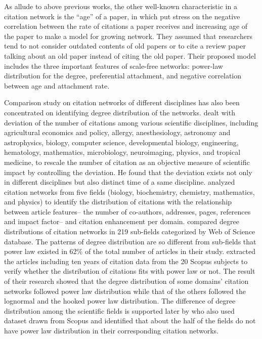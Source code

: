 \documentclass{article}
\begin{document}
As allude to above previous works, the other well-known characteristic in a citation network is the “age” of a paper, in which \cite{klemm2002highly} put stress on the negative correlation between the rate of citations a paper receives and increasing age of the paper to make a model for growing network. They assumed that researchers tend to not consider outdated contents of old papers or to cite a review paper talking about an old paper instead of citing the old paper. Their proposed model includes the three important features of scale-free networks: power-law distribution for the degree, preferential attachment, and negative correlation between age and attachment rate.  

Comparison study on citation networks of different disciplines has also been concentrated on identifying degree distribution of the networks. \cite{radicchi2008universality} dealt with deviation of the number of citations among various scientific disciplines, including agricultural economics and policy, allergy, anesthesiology, astronomy and astrophysics, biology, computer science, developmental biology, engineering, hematology, mathematics, microbiology, neuroimaging, physics, and tropical medicine, to rescale the number of citation as an objective measure of scientific impact by controlling the deviation. He found that the deviation exists not only in different disciplines but also distinct time of a same discipline. \cite{vieira2010citations} analyzed citation networks from five fields (biology, biochemistry, chemistry, mathematics, and physics) to identify the distribution of citations with the relationship between article features-- the number of co-authors, addresses, pages, references and impact factor-- and citation enhancement per domain. \cite{albarran2011skewness} compared degree distributions of citation networks in 219 sub-fields categorized by Web of Science database. The patterns of degree distribution are so different from sub-fields that power law existed in 62\% of the total number of articles in their study. \cite{thelwall2014distributions} extracted the articles including ten years of citation data from the 20 Scopus subjects to verify whether the distribution of citations fits with power law or not. The result of their research showed that the degree distribution of some domains’ citation networks followed power law distribution while that of the others followed the lognormal and the hooked power law distribution. The difference of degree distribution among the scientific fields is supported later by \cite{brzezinski2015power} who also used dataset drawn from Scopus and identified that about the half of the fields do not have power law distribution in their corresponding citation networks. 
\end{document}
